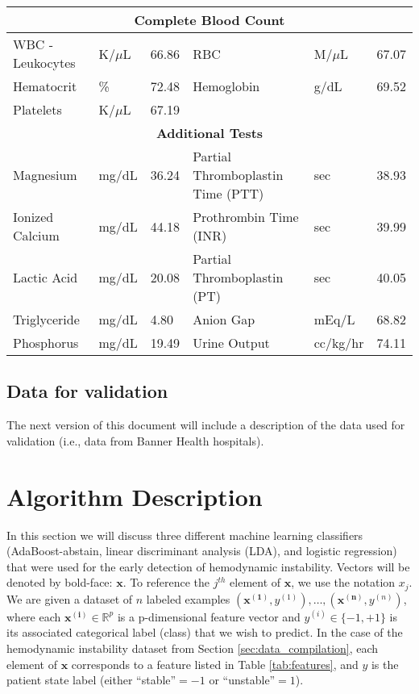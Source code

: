 \documentclass[
   technote
]{phildoc}
\newcommand{\ie}{i.e.,}
\newcommand{\mx}[1]{{\color{green}{MX: #1}}}
\begin{document}
\begin{table}[h!]
{\begin{tabular}{|l|l|l|l|l|l|}
\multicolumn{6}{|c|}{\textbf{Complete Blood Count}} \\
\hline

WBC - Leukocytes	& K/$\mu$L 	& 66.86	&	RBC			& M/$\mu$L	& 67.07 \\	
Hematocrit			& \%		& 72.48	&	Hemoglobin	& g/dL		& 69.52	\\		
Platelets			& K/$\mu$L	& 67.19	&				&			&	    \\		
		
\hline
\multicolumn{6}{|c|}{\textbf{Additional Tests}} \\
\hline

Magnesium		& mg/dL	& 36.24	& 	Partial Thromboplastin Time (PTT)	& sec		& 38.93\\
Ionized Calcium	& mg/dL	& 44.18	&	Prothrombin Time (INR)				& sec		& 39.99\\
Lactic Acid		& mg/dL	& 20.08	&	Partial Thromboplastin (PT)			& sec		& 40.05\\
Triglyceride	& mg/dL	& 4.80	&	Anion Gap							& mEq/L		& 68.82\\
Phosphorus		& mg/dL	& 19.49	&	Urine Output						& cc/kg/hr	& 74.11\\


\hline
\end{tabular}}
\end{table}  



\subsection{Data for validation} The next version of this document will include a description of the data used for validation (\ie{} data from Banner Health hospitals).

\section{Algorithm Description}
\label{sec:alg-desc}
In this section we will discuss three different machine learning classifiers (AdaBoost-abstain, linear discriminant analysis (LDA), and logistic regression) that were used for the early detection of hemodynamic instability. Vectors will be denoted by bold-face: $\bm{x}$.  To reference the $j^{th}$ element of $\bm{x}$, we use the notation $x_j$. We are given a dataset of $n$ labeled examples $(\bm{x^{(1)}},y^{(1)}),\dots,(\bm{x^{(n)}},y^{(n)})$, where each $\bm{x^{(i)}}\in \mathbb{R}^p$ is a p-dimensional feature vector and $y^{(i)}\in\{-1,+1\}$ is its associated categorical label (class) that we wish to predict. In the case of the hemodynamic instability dataset from Section \ref{sec:data_compilation}, each element of $\bm{x}$ corresponds to a feature listed in Table \ref{tab:features}, and $y$ is the patient state label (either ``stable''$=-1$ or ``unstable''$=1$).
\end{document}
